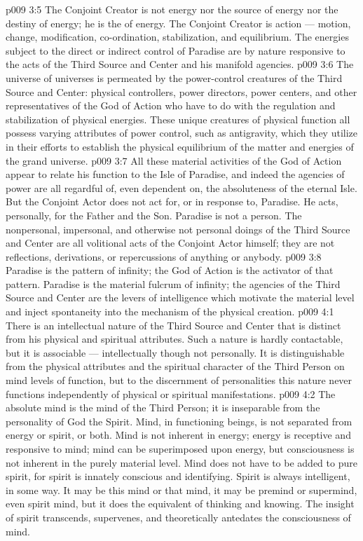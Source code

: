 \vs p009 3:5 \pc The Conjoint Creator is not energy nor the source of energy nor the destiny of energy; he is the  of energy. The Conjoint Creator is action --- motion, change, modification, co\hyp{}ordination, stabilization, and equilibrium. The energies subject to the direct or indirect control of Paradise are by nature responsive to the acts of the Third Source and Center and his manifold agencies.
\vs p009 3:6 The universe of universes is permeated by the power\hyp{}control creatures of the Third Source and Center: physical controllers, power directors, power centers, and other representatives of the God of Action who have to do with the regulation and stabilization of physical energies. These unique creatures of physical function all possess varying attributes of power control, such as antigravity, which they utilize in their efforts to establish the physical equilibrium of the matter and energies of the grand universe.
\vs p009 3:7 All these material activities of the God of Action appear to relate his function to the Isle of Paradise, and indeed the agencies of power are all regardful of, even dependent on, the absoluteness of the eternal Isle. But the Conjoint Actor does not act for, or in response to, Paradise. He acts, personally, for the Father and the Son. Paradise is not a person. The nonpersonal, impersonal, and otherwise not personal doings of the Third Source and Center are all volitional acts of the Conjoint Actor himself; they are not reflections, derivations, or repercussions of anything or anybody.
\vs p009 3:8 Paradise is the pattern of infinity; the God of Action is the activator of that pattern. Paradise is the material fulcrum of infinity; the agencies of the Third Source and Center are the levers of intelligence which motivate the material level and inject spontaneity into the mechanism of the physical creation.
\vs p009 4:1 There is an intellectual nature of the Third Source and Center that is distinct from his physical and spiritual attributes. Such a nature is hardly contactable, but it is associable --- intellectually though not personally. It is distinguishable from the physical attributes and the spiritual character of the Third Person on mind levels of function, but to the discernment of personalities this nature never functions independently of physical or spiritual manifestations.
\vs p009 4:2 The absolute mind is the mind of the Third Person; it is inseparable from the personality of God the Spirit. Mind, in functioning beings, is not separated from energy or spirit, or both. Mind is not inherent in energy; energy is receptive and responsive to mind; mind can be superimposed upon energy, but consciousness is not inherent in the purely material level. Mind does not have to be added to pure spirit, for spirit is innately conscious and identifying. Spirit is always intelligent,  in some way. It may be this mind or that mind, it may be premind or supermind, even spirit mind, but it does the equivalent of thinking and knowing. The insight of spirit transcends, supervenes, and theoretically antedates the consciousness of mind.
